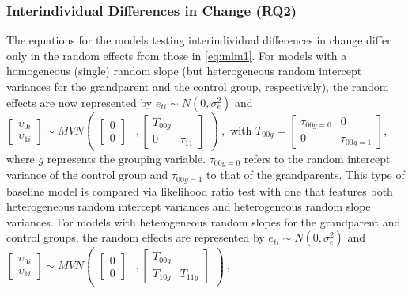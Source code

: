 \documentclass[
  english,
  man,floatsintext]{apa7}
\begin{document}
\hypertarget{interindividual-differences-in-change-rq2}{%
\subsubsection{Interindividual Differences in Change (RQ2)}\label{interindividual-differences-in-change-rq2}}

The equations for the models testing interindividual differences in change differ only in the random effects from those in \eqref{eq:mlm1}. For models with a homogeneous (single) random slope (but heterogeneous random intercept variances for the grandparent and the control group, respectively), the random effects are now represented by \(e_{ti} \sim N(0, \sigma_e^2)\) and \(\begin{bmatrix} \upsilon_{0i}\\ \upsilon_{1i} \end{bmatrix}\sim MVN\begin{pmatrix}\begin{bmatrix}  0\\0 \end{bmatrix} &,\begin{bmatrix} T_{00g} & \\ 0 & \tau_{11} \end{bmatrix}\end{pmatrix}\ ,\)
with \(T_{00g}=\begin{bmatrix} \tau_{00g=0} & 0\\ 0 & \tau_{00g=1}\end{bmatrix}\),\\
\noindent where \(g\) represents the grouping variable. \(\tau_{00g=0}\) refers to the random intercept variance of the control group and \(\tau_{00g=1}\) to that of the grandparents.
This type of baseline model is compared via likelihood ratio test with one that features both heterogeneous random intercept variances and heterogeneous random slope variances. For models with heterogeneous random slopes for the grandparent and control groups, the random effects are represented by \(e_{ti} \sim N(0, \sigma_e^2)\) and \(\begin{bmatrix} \upsilon_{0i}\\ \upsilon_{1i} \end{bmatrix}\sim MVN\begin{pmatrix}\begin{bmatrix}  0\\0 \end{bmatrix} &,\begin{bmatrix} T_{00g} & \\ T_{10g} & T_{11g} \end{bmatrix}\end{pmatrix}\ ,\)
\end{document}
